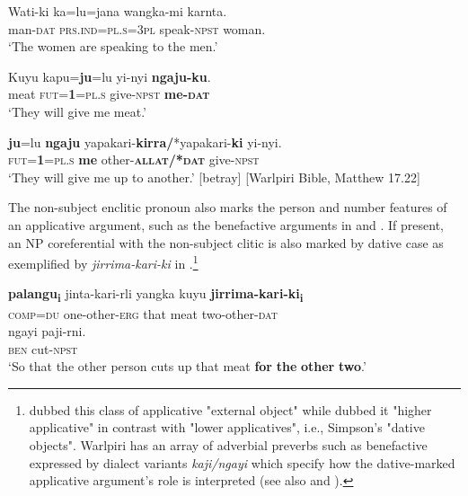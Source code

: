 \documentclass[output=paper]{../langscibook}
\begin{document}
\ex
\label{ex:laughren:3b}
\gll Wati-ki  ka=lu=jana  wangka-mi   karnta.\\
    man-\textsc{dat}  \textsc{prs.ind=pl.s=3pl}  speak-\textsc{npst}  woman.\\
\glt `The women are speaking to the men.'
\z
\z

\ea%
\label{ex:laughren:4}

\ea
\label{ex:laughren:4a}
\gll Kuyu  kapu=\textbf{ju}=lu yi-nyi \textbf{ngaju-ku}.\\
    meat \textsc{fut=}\textbf{\textsc{1}}\textsc{=pl.s}  give-\textsc{npst}  \textbf{me\textsc{{}-dat}}\\
\glt `They will give me meat.'

\ex
\label{ex:laughren:4b}
\textbf{{ju}}{=lu} \textbf{{ngaju}  }{yapakari-}\textbf{{kirra/}}{*yapakari-}\textbf{ki} {yi-nyi.} \\
    \textsc{fut}=\textbf{\textsc{1}}=\textsc{pl.s}  \textbf{me}  other-\textbf{\textsc{allat/*dat}  }give-\textsc{npst}\\
\glt `They will give me up to another.' [betray] [Warlpiri Bible, Matthew 17.22]
\z
\z

The non-subject enclitic pronoun also marks the person and number features of an applicative argument, such as the benefactive arguments in  and . If present, an NP coreferential with the non-subject clitic is also marked by dative case as exemplified by \textit{jirrima-kari-ki} in .\footnote{\citet{Simpson1991} dubbed this class of applicative "external object" while \citet{Legate2002} dubbed it "higher applicative" in contrast with "lower applicatives", i.e., Simpson's "dative objects". Warlpiri has an array of adverbial preverbs such as benefactive expressed by dialect variants \textit{kaji/ngayi} which specify how the dative-marked applicative argument's role is interpreted (see also \citealt{Hale1982} and \citealt{Nash1986}).}

\ea%
    \label{ex:laughren:5}

\ea
\label{ex:laughren:5a}
\textbf{{palangu}}\textbf{{\textsubscript{i}}} jinta-kari-rli   yangka   kuyu \textbf{jirrima-kari-ki}\textbf{{\textsubscript{i}}} \\
    \textsc{comp=du}  one-other-\textsc{erg}  that  meat  two-other-\textsc{dat}\\

\gll    ngayi  paji-rni.\\
    \textsc{ben}  cut-\textsc{npst}\\
\glt `So that the other person cuts up that meat \textbf{for} \textbf{the} \textbf{other} \textbf{two}.'
\end{document}
